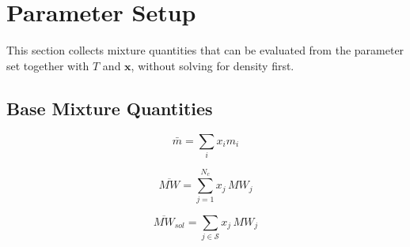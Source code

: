 \documentclass[12pt, letterpaper]{article}
\begin{document}
\section{Parameter Setup}
\label{sec:parameter_setup}

This section collects mixture quantities that can be evaluated from the parameter set together with \(T\) and \(\mathbf{x}\), without solving for density first.

\subsection{Base Mixture Quantities}


\begin{equation}
    \bar{m}=\sum_{i} x_{i} m_{i}
    \label{eq:m_bar}
\end{equation}


\begin{equation}
    \overline{MW}=\sum_{j=1}^{N_{c}} x_{j}\,MW_{j}
    \label{eq:mw_bar}
\end{equation}


\begin{equation}
    \overline{MW}_{sol}=\sum_{j\in\mathcal S}x_{j}\,MW_{j}
    \label{eq:mw_solvent_bar}
\end{equation}

\end{document}
